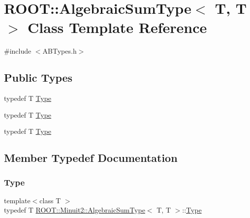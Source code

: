 \hypertarget{classROOT_1_1Minuit2_1_1AlgebraicSumType_3_01T_00_01T_01_4}{}\section{R\+O\+OT\+:\+:Algebraic\+Sum\+Type$<$ T, T $>$ Class Template Reference}
\label{classROOT_1_1Minuit2_1_1AlgebraicSumType_3_01T_00_01T_01_4}


{\ttfamily \#include $<$A\+B\+Types.\+h$>$}

\subsection*{Public Types}
\begin{DoxyCompactItemize}
\item 
typedef T \mbox{\hyperlink{classROOT_1_1Minuit2_1_1AlgebraicSumType_3_01T_00_01T_01_4_a840029212ccc1ff6fce3aeb7ec3187de}{Type}}
\item 
typedef T \mbox{\hyperlink{classROOT_1_1Minuit2_1_1AlgebraicSumType_3_01T_00_01T_01_4_a840029212ccc1ff6fce3aeb7ec3187de}{Type}}
\item 
typedef T \mbox{\hyperlink{classROOT_1_1Minuit2_1_1AlgebraicSumType_3_01T_00_01T_01_4_a840029212ccc1ff6fce3aeb7ec3187de}{Type}}
\end{DoxyCompactItemize}


\subsection{Member Typedef Documentation}
\mbox{\label{classROOT_1_1Minuit2_1_1AlgebraicSumType_3_01T_00_01T_01_4_a840029212ccc1ff6fce3aeb7ec3187de}} 
\subsubsection{\texorpdfstring{Type}{Type}\hspace{0.1cm}{\footnotesize\ttfamily [1/3]}}
{\footnotesize\ttfamily template$<$class T $>$ \\
typedef T \mbox{\hyperlink{classROOT_1_1Minuit2_1_1AlgebraicSumType}{R\+O\+O\+T\+::\+Minuit2\+::\+Algebraic\+Sum\+Type}}$<$ T, T $>$\+::\mbox{\hyperlink{classROOT_1_1Minuit2_1_1AlgebraicSumType_3_01T_00_01T_01_4_a840029212ccc1ff6fce3aeb7ec3187de}{Type}}}


